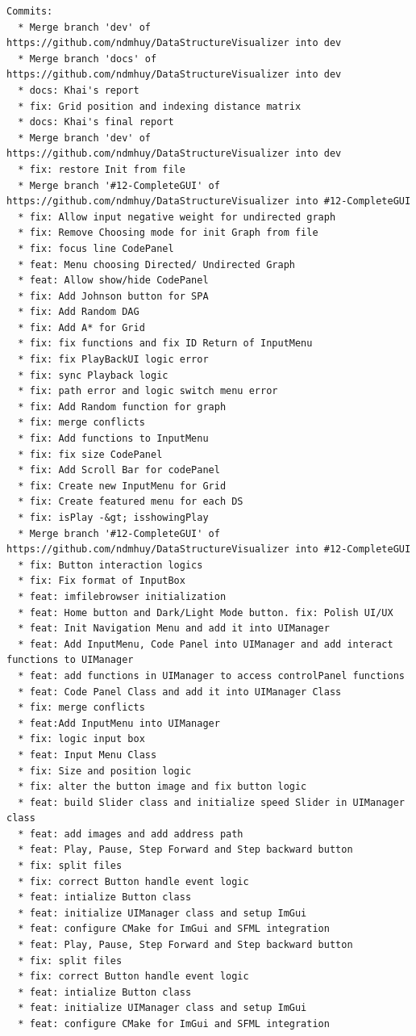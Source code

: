 \begin{small}
\begin{verbatim}
Commits:
  * Merge branch 'dev' of https://github.com/ndmhuy/DataStructureVisualizer into dev
  * Merge branch 'docs' of https://github.com/ndmhuy/DataStructureVisualizer into dev
  * docs: Khai's report
  * fix: Grid position and indexing distance matrix
  * docs: Khai's final report
  * Merge branch 'dev' of https://github.com/ndmhuy/DataStructureVisualizer into dev
  * fix: restore Init from file
  * Merge branch '#12-CompleteGUI' of https://github.com/ndmhuy/DataStructureVisualizer into #12-CompleteGUI
  * fix: Allow input negative weight for undirected graph
  * fix: Remove Choosing mode for init Graph from file
  * fix: focus line CodePanel
  * feat: Menu choosing Directed/ Undirected Graph
  * feat: Allow show/hide CodePanel
  * fix: Add Johnson button for SPA
  * fix: Add Random DAG
  * fix: Add A* for Grid
  * fix: fix functions and fix ID Return of InputMenu
  * fix: fix PlayBackUI logic error
  * fix: sync Playback logic
  * fix: path error and logic switch menu error
  * fix: Add Random function for graph
  * fix: merge conflicts
  * fix: Add functions to InputMenu
  * fix: fix size CodePanel
  * fix: Add Scroll Bar for codePanel
  * fix: Create new InputMenu for Grid
  * fix: Create featured menu for each DS
  * fix: isPlay -&gt; isshowingPlay
  * Merge branch '#12-CompleteGUI' of https://github.com/ndmhuy/DataStructureVisualizer into #12-CompleteGUI
  * fix: Button interaction logics
  * fix: Fix format of InputBox
  * feat: imfilebrowser initialization
  * feat: Home button and Dark/Light Mode button. fix: Polish UI/UX
  * feat: Init Navigation Menu and add it into UIManager
  * feat: Add InputMenu, Code Panel into UIManager and add interact functions to UIManager
  * feat: add functions in UIManager to access controlPanel functions
  * feat: Code Panel Class and add it into UIManager Class
  * fix: merge conflicts
  * feat:Add InputMenu into UIManager
  * fix: logic input box
  * feat: Input Menu Class
  * fix: Size and position logic
  * fix: alter the button image and fix button logic
  * feat: build Slider class and initialize speed Slider in UIManager class
  * feat: add images and add address path
  * feat: Play, Pause, Step Forward and Step backward button
  * fix: split files
  * fix: correct Button handle event logic
  * feat: intialize Button class
  * feat: initialize UIManager class and setup ImGui
  * feat: configure CMake for ImGui and SFML integration
  * feat: Play, Pause, Step Forward and Step backward button
  * fix: split files
  * fix: correct Button handle event logic
  * feat: intialize Button class
  * feat: initialize UIManager class and setup ImGui
  * feat: configure CMake for ImGui and SFML integration



\end{verbatim}
\end{small}
